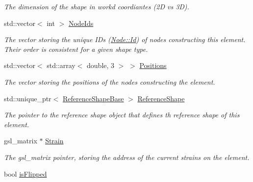 \begin{DoxyCompactItemize}
\begin{DoxyCompactList}\small\item\em The dimension of the shape in workd coordiantes (2\+D vs 3\+D). \end{DoxyCompactList}\item 
\hypertarget{classShapeBase_af96e17fa9a23289fb743ff0722a7dc64}{}std\+::vector$<$ int $>$ \hyperlink{classShapeBase_af96e17fa9a23289fb743ff0722a7dc64}{Node\+Ids}\label{classShapeBase_af96e17fa9a23289fb743ff0722a7dc64}

\begin{DoxyCompactList}\small\item\em The vector storing the unique I\+Ds (\hyperlink{classNode_a1bd379569cc1a8b96432e61971aed4d9}{Node\+::\+Id}) of nodes constructing this element. Their order is consistent for a given shape type. \end{DoxyCompactList}\item 
\hypertarget{classShapeBase_a6a6bd8c65e2a0bfea3a956604bc05cb9}{}std\+::vector$<$ std\+::array$<$ double, 3 $>$ $>$ \hyperlink{classShapeBase_a6a6bd8c65e2a0bfea3a956604bc05cb9}{Positions}\label{classShapeBase_a6a6bd8c65e2a0bfea3a956604bc05cb9}

\begin{DoxyCompactList}\small\item\em The vector storing the positions of the nodes constructing the element. \end{DoxyCompactList}\item 
\hypertarget{classShapeBase_a93270dee7f71d075c73d1720c8279a44}{}std\+::unique\+\_\+ptr$<$ \hyperlink{classReferenceShapeBase}{Reference\+Shape\+Base} $>$ \hyperlink{classShapeBase_a93270dee7f71d075c73d1720c8279a44}{Reference\+Shape}\label{classShapeBase_a93270dee7f71d075c73d1720c8279a44}

\begin{DoxyCompactList}\small\item\em The pointer to the reference shape object that defines th reference shape of this element. \end{DoxyCompactList}\item 
\hypertarget{classShapeBase_a4bda00f80968d836c647afe5f6d1fb36}{}gsl\+\_\+matrix $\ast$ \hyperlink{classShapeBase_a4bda00f80968d836c647afe5f6d1fb36}{Strain}\label{classShapeBase_a4bda00f80968d836c647afe5f6d1fb36}

\begin{DoxyCompactList}\small\item\em The gsl\+\_\+matrix pointer, storing the address of the current strains on the element. \end{DoxyCompactList}\item 
\hypertarget{classShapeBase_a3da6d64116b5d73e2bb27d378035df41}{}bool \hyperlink{classShapeBase_a3da6d64116b5d73e2bb27d378035df41}{is\+Flipped}\label{classShapeBase_a3da6d64116b5d73e2bb27d378035df41}


\end{DoxyCompactItemize}
